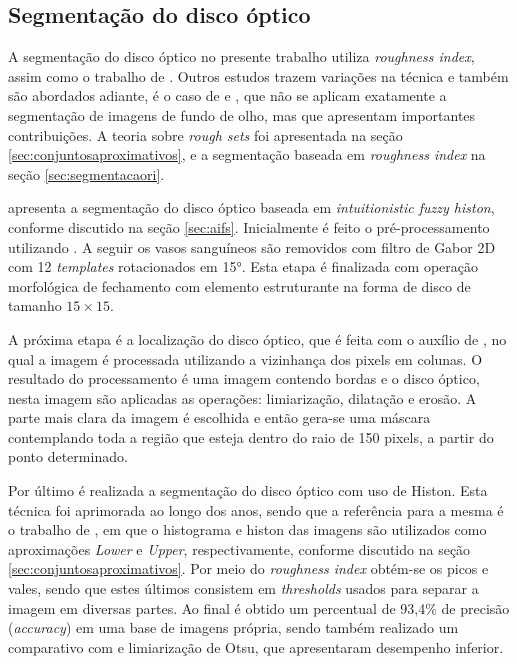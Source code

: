  

\subsection{Segmentação do disco óptico}

A segmentação do disco óptico no presente trabalho utiliza \textit{roughness index}, assim como o trabalho de . Outros estudos trazem variações na técnica e também são abordados adiante, é o caso de  e , que não se aplicam exatamente a segmentação de imagens de fundo de olho, mas que apresentam importantes contribuições.  A teoria sobre \textit{rough sets} foi apresentada na seção \ref{sec:conjuntosaproximativos}, e a segmentação baseada em  \textit{roughness index} na seção \ref{sec:segmentacaori}.

 apresenta a segmentação do disco óptico baseada em \textit{intuitionistic fuzzy histon}, conforme discutido na seção \ref{sec:aifs}. Inicialmente é feito o pré-processamento utilizando . A seguir os vasos sanguíneos são removidos com  filtro de Gabor 2D com 12 \textit{templates} rotacionados em 15°. Esta etapa é finalizada com operação  morfológica de fechamento com elemento estruturante na forma de disco de tamanho $15 \times 15$.  

A próxima etapa é a localização do disco óptico, que é feita com o auxílio de , no qual a imagem é processada utilizando a  vizinhança dos pixels em colunas. O resultado do processamento é uma imagem contendo bordas e o disco óptico, nesta imagem são aplicadas as operações: limiarização, dilatação e erosão. A parte mais clara da imagem é escolhida e então  gera-se uma máscara contemplando toda a região que esteja dentro do raio de 150 pixels, a partir do ponto determinado. 

Por último é realizada a segmentação do disco óptico com uso de   Histon. Esta técnica foi aprimorada ao longo dos anos, sendo que a referência para a mesma é o trabalho de , em que o histograma e histon das imagens são utilizados como aproximações \textit{Lower} e \textit{Upper}, respectivamente, conforme discutido na seção \ref{sec:conjuntosaproximativos}. Por meio do \textit{roughness index} obtém-se os picos e vales, sendo que estes últimos consistem em \textit{thresholds} usados para separar a imagem em diversas partes. Ao final é obtido um percentual de 93,4\% de precisão (\textit{accuracy}) em uma base de imagens própria, sendo também realizado um comparativo com  e limiarização de Otsu, que apresentaram desempenho inferior. 


